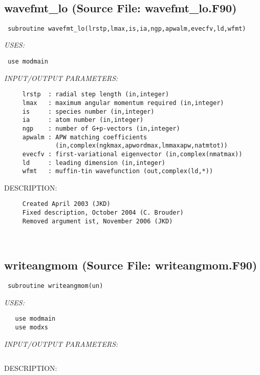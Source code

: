 \documentclass[11pt]{article}
\begin{document}

 
 
\mbox{}\hrulefill\ 
 
\subsection{wavefmt\_lo (Source File: wavefmt\_lo.F90)}


\begin{verbatim} subroutine wavefmt_lo(lrstp,lmax,is,ia,ngp,apwalm,evecfv,ld,wfmt)\end{verbatim}{\em USES:}
\begin{verbatim} use modmain\end{verbatim}{\em INPUT/OUTPUT PARAMETERS:}
\begin{verbatim}     lrstp  : radial step length (in,integer)
     lmax   : maximum angular momentum required (in,integer)
     is     : species number (in,integer)
     ia     : atom number (in,integer)
     ngp    : number of G+p-vectors (in,integer)
     apwalm : APW matching coefficients
              (in,complex(ngkmax,apwordmax,lmmaxapw,natmtot))
     evecfv : first-variational eigenvector (in,complex(nmatmax))
     ld     : leading dimension (in,integer)
     wfmt   : muffin-tin wavefunction (out,complex(ld,*))\end{verbatim}
{\sf DESCRIPTION:\\ }


  
\begin{verbatim}     Created April 2003 (JKD)
     Fixed description, October 2004 (C. Brouder)
     Removed argument ist, November 2006 (JKD)\end{verbatim}


 
 
\mbox{}\hrulefill\ 
 
\subsection{writeangmom (Source File: writeangmom.F90)}


\begin{verbatim} subroutine writeangmom(un)\end{verbatim}{\em USES:}
\begin{verbatim}   use modmain
   use modxs\end{verbatim}{\em INPUT/OUTPUT PARAMETERS:}
\begin{verbatim} \end{verbatim}
{\sf DESCRIPTION:\\ }
\end{document}
